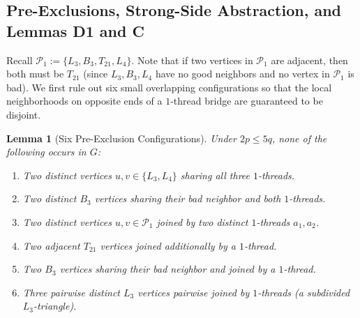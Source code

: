 \documentclass[11pt,a4paper]{article}
\newtheorem{lemma}[theorem]{Lemma}
\theoremstyle{definition}
\newcommand{\Ppoor}{\mathcal{P}_1}
\begin{document}
\subsection{Pre-Exclusions, Strong-Side Abstraction, and Lemmas D1 and C}

Recall $\Ppoor := \{L_3, B_3, T_{21}, L_4\}$. Note that if two vertices in $\Ppoor$ are adjacent, then both must be $T_{21}$ (since $L_3, B_3, L_4$ have no good neighbors and no vertex in $\Ppoor$ is bad). We first rule out six small overlapping configurations so that the local neighborhoods on opposite ends of a $1$-thread bridge are guaranteed to be disjoint.

\begin{lemma}[Six Pre-Exclusion Configurations]\label{lem:pre-excl}
Under $2p \le 5q$, none of the following occurs in $G$:
\begin{enumerate}[label=(\roman*),leftmargin=*,itemsep=1pt]
  \item Two distinct vertices $u, v \in \{L_3, L_4\}$ sharing all three $1$-threads.
  \item Two distinct $B_3$ vertices sharing their bad neighbor and both $1$-threads.
  \item Two distinct vertices $u, v \in \Ppoor$ joined by two distinct $1$-threads $a_1, a_2$.
  \item Two adjacent $T_{21}$ vertices joined additionally by a $1$-thread.
  \item Two $B_3$ vertices sharing their bad neighbor and joined by a $1$-thread.
  \item Three pairwise distinct $L_3$ vertices pairwise joined by $1$-threads (a subdivided $L_3$-triangle).
\end{enumerate}
\end{lemma}
\end{document}
